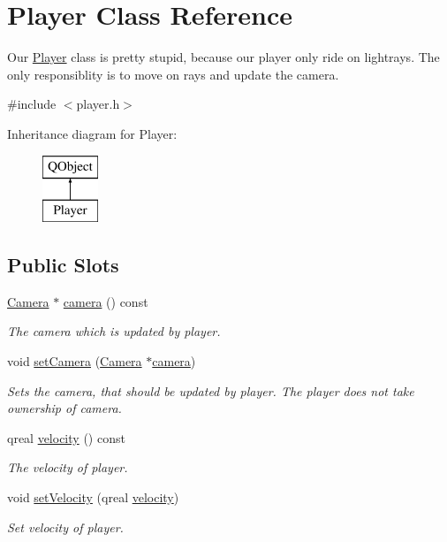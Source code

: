 \hypertarget{class_player}{}\section{Player Class Reference}
\label{class_player}


Our \hyperlink{class_player}{Player} class is pretty stupid, because our player only ride on lightrays. The only responsiblity is to move on rays and update the camera.  




{\ttfamily \#include $<$player.\+h$>$}

Inheritance diagram for Player\+:\begin{figure}[H]
\begin{center}
\leavevmode
\includegraphics[height=2.000000cm]{class_player}
\end{center}
\end{figure}
\subsection*{Public Slots}
\begin{DoxyCompactItemize}
\item 
\hyperlink{class_camera}{Camera} $\ast$ \hyperlink{class_player_a10605ebcab0fac1b542d1bd8f3d23acd}{camera} () const 
\begin{DoxyCompactList}\small\item\em The camera which is updated by player. \end{DoxyCompactList}\item 
void \hyperlink{class_player_af5e57b3a9719cd999aff21d59355be52}{set\+Camera} (\hyperlink{class_camera}{Camera} $\ast$\hyperlink{class_player_a4e1ae30bdaec837b94451416a523d5cb}{camera})
\begin{DoxyCompactList}\small\item\em Sets the camera, that should be updated by player. The player does not take ownership of camera. \end{DoxyCompactList}\item 
qreal \hyperlink{class_player_a836e1afdde2c379b964bcf5d3811f0da}{velocity} () const 
\begin{DoxyCompactList}\small\item\em The velocity of player. \end{DoxyCompactList}\item 
void \hyperlink{class_player_ae2d5423c7bf6c6c924a451dc1cdab6aa}{set\+Velocity} (qreal \hyperlink{class_player_a53141a3791c456938945973cc78a2ea7}{velocity})
\begin{DoxyCompactList}\small\item\em Set velocity of player. \end{DoxyCompactList}\end{DoxyCompactItemize}
